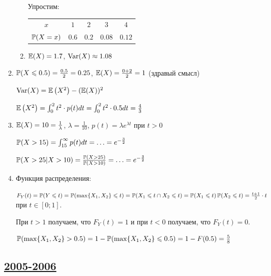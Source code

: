 \begin{enumerate}
\begin{enumerate}
Упростим:

\begin{center}
\begin{tabular}{@{}ccccc@{}}
\toprule
$x$       & $1$   & $2$   & $3$    & $4$    \\
$\P(X=x)$ & $0.6$ & $0.2$ & $0.08$ & $0.12$ \\ \bottomrule
\end{tabular}
\end{center}

\item $\E(X) = 1.7$, $\Var(X) \approx 1.08$
\end{enumerate}
\item  $\P(X \le 0.5) = \frac{0.5}{2} = 0.25$, $\E(X) = \frac{0 + 2}{2} = 1$ (здравый смысл)

$\Var(X) = \E\left(X^{2}\right) - (\E(X))^{2}$

$\E\left(X^{2}\right) = \int_{0}^{2}t^{2} \cdot p(t) dt = \int_{0}^{2}t^{2} \cdot 0.5 dt
= \frac{4}{3}$
\item $\E(X) = 10 = \frac{1}{\lambda}$, $\lambda = \frac{1}{10}$,
$p(t) = \lambda e^{\lambda t}$ при $t>0$

$\P(X > 15) = \int_{15}^{\infty}p(t)dt = \ldots = e^{-\frac{3}{2}}$

$\P(X > 25 | X > 10) = \frac{\P(X > 25)}{\P(X > 10)} = \ldots = e^{-\frac{3}{2}}$
\item Функция распределения:

$F_{Y}(t) = \P(Y \le t) = \P (\max\{X_{1},X_{2}\}\le t) = \P(X_{1}\le t\cap X_{2}\le t)
= \P(X_{1}\le t)\P(X_{2}\le t) = \frac{t+1}{2}\cdot t$ при $t\in [0;1]$.

При $t>1$ получаем, что $F_{Y}(t) = 1$ и при $t<0$ получаем, что $F_{Y}(t) = 0$.

$\P(\max\{X_{1},X_{2}\} > 0.5) = 1 - \P(\max\{X_{1},X_{2}\}\le 0.5) = 1 - F(0.5) = \frac{5}{8}$
\end{enumerate}



\subsection[2005-2006]{\hyperref[sec:kr_01_2005_2006]{2005-2006}}
\label{sec:sol_kr_01_2005_2006}


